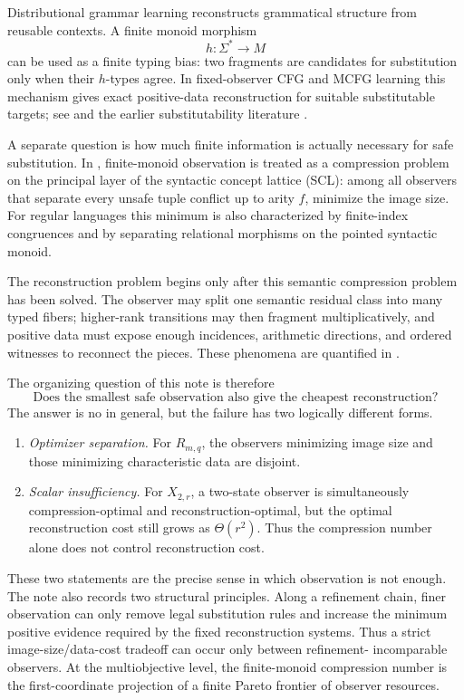 \documentclass[11pt]{article}
\theoremstyle{definition}
\theoremstyle{remark}
\begin{document}
Distributional grammar learning reconstructs grammatical structure from
reusable contexts.  A finite monoid morphism
\[
  h:\Sigma^*\to M
\]
can be used as a finite typing bias: two fragments are candidates for
substitution only when their $h$-types agree.  In fixed-observer CFG and MCFG
learning this mechanism gives exact positive-data reconstruction for suitable
substitutable targets; see \cite{KuriyamaCFG,KuriyamaMCFG} and the earlier
substitutability literature \cite{ClarkEyraud2007,Yoshinaka2011}.

A separate question is how much finite information is actually necessary for
safe substitution.  In \cite{KuriyamaSCL}, finite-monoid observation is treated
as a compression problem on the principal layer of the syntactic concept
lattice (SCL): among all observers that separate every unsafe tuple conflict up
to arity $f$, minimize the image size.  For regular languages this minimum is
also characterized by finite-index congruences and by separating relational
morphisms on the pointed syntactic monoid.

The reconstruction problem begins only after this semantic compression problem
has been solved.  The observer may split one semantic residual class into many
typed fibers; higher-rank transitions may then fragment multiplicatively, and
positive data must expose enough incidences, arithmetic directions, and
ordered witnesses to reconnect the pieces.  These phenomena are quantified in
\cite{KuriyamaOFET}.

The organizing question of this note is therefore
\[
 \boxed{\text{Does the smallest safe observation also give the cheapest reconstruction?}}
\]
The answer is no in general, but the failure has two logically different
forms.

\begin{enumerate}[label=(\roman*),leftmargin=*]
\item \emph{Optimizer separation.}  For $R_{m,q}$, the observers minimizing
      image size and those minimizing characteristic data are disjoint.
\item \emph{Scalar insufficiency.}  For $X_{2,r}$, a two-state observer is
      simultaneously compression-optimal and reconstruction-optimal, but the
      optimal reconstruction cost still grows as $\Theta(r^2)$.  Thus the
      compression number alone does not control reconstruction cost.
\end{enumerate}

These two statements are the precise sense in which observation is not enough.
The note also records two structural principles.  Along a refinement chain,
finer observation can only remove legal substitution rules and increase the
minimum positive evidence required by the fixed reconstruction systems.  Thus
a strict image-size/data-cost tradeoff can occur only between refinement-
incomparable observers.  At the multiobjective level, the finite-monoid
compression number is the first-coordinate projection of a finite Pareto
frontier of observer resources.
\end{document}
